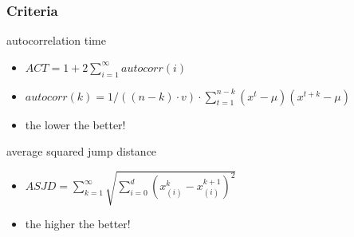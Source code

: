 \begin{frame}
\frametitle{Criteria}
\begin{block}{autocorrelation time}
\begin{itemize}
  \item $ACT = 1 + 2\sum_{i=1}^{\infty} autocorr(i)$
  \item $autocorr(k) = 1/((n-k)\cdot v)\cdot 
  \sum_{t=1}^{n-k}(x^t-\mu)(x^{t+k}-\mu)$
  \item the lower the better!
\end{itemize}

\end{block}
\begin{block}{average squared jump distance}
\begin{itemize}
  \item $ASJD = \sum_{k=1}^\infty \sqrt{\sum_{i=0}^d (x_{(i)}^k-x_{(i)}^{k+1})^2}$
  \item the higher the better!
\end{itemize}

\end{block}
\end{frame}